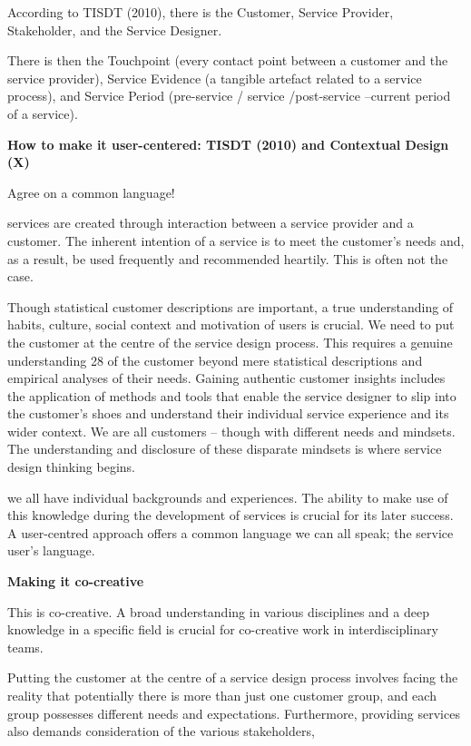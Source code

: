 According to TISDT (2010), there is the Customer, Service Provider, Stakeholder, and the Service Designer.

There is then the Touchpoint (every contact point between a customer and the service provider), Service Evidence (a tangible artefact related to a service process), and Service Period (pre-service / service /post-service --current period of a service).

\textbf{How to make it user-centered: TISDT (2010) and Contextual Design (X)}

Agree on a common language!

services are created through interaction between a service provider and a customer. The inherent intention of a service is to meet the customer’s needs and, as a result, be used frequently and recommended heartily. This is often not the case.

Though statistical customer descriptions are important, a true understanding of habits, culture, social context and motivation of users is crucial. We need to put the customer at the centre of the service design process. This requires a genuine understanding
28
of the customer beyond mere statistical descriptions and empirical analyses of their needs. Gaining authentic customer insights includes the application of methods and tools that enable the service designer to slip into the customer’s shoes and understand their individual service experience and its wider context. We are all customers – though with different needs and mindsets. The understanding and disclosure of these disparate mindsets is where service design thinking begins.

we all have individual backgrounds and experiences. The ability to make use of this knowledge during the development of services is crucial for its later success. A user-centred approach offers a common language we can all speak; the service user’s language.

\textbf{Making it co-creative}

This is co-creative.
A broad understanding in various disciplines and a deep knowledge in a specific field is crucial for co-creative work in interdisciplinary teams.


Putting the customer at the centre of a service design process involves facing the reality that potentially there is more than just one customer group, and each group possesses different needs and expectations.
Furthermore, providing services also demands consideration of the various stakeholders,

